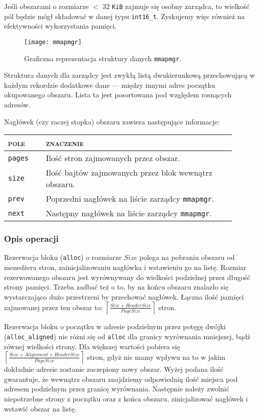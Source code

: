 \documentclass[12pt,a4paper,titlepage,twoside]{mwart}
\begin{document}
Jeśli obszarami o rozmiarze $<$ $32$ \verb+KiB+ zajmuje się osobny zarządca, to
wielkość pól będzie mógł składować w danej typu \verb+int16_t+. Zyskujemy więc
również na efektywności wykorzystania pamięci.

\begin{figure}[h]
\centering
\texttt{[image: mmapmgr]}
\caption{Graficzna reprezentacja struktury danych \texttt{mmapmgr}.}
\end{figure}

Struktura danych dla zarządcy jest zwykłą listą dwukierunkową przechowującą w
każdym rekordzie dodatkowe dane --- między innymi adres początku okupowanego
obszaru. Lista ta jest posortowana pod względem rosnących adresów.

Nagłówek (czy raczej stopka) obszaru zawiera następujące informacje:
\begin{center}
\begin{tabular}{|m{0.15\linewidth}|p{0.75\linewidth}|}
\hline
\textsc{pole} & \textsc{znaczenie} \\
\hline
\hline
\verb+pages+ & Ilość stron zajmowanych przez obszar. \\
\hline
\verb+size+	 & Ilość bajtów zajmowanych przez blok wewnątrz obszaru. \\
\hline
\verb+prev+	 & Poprzedni nagłówek na liście zarządcy \texttt{mmapmgr}. \\
\hline
\verb+next+	 & Następny nagłówek na liście zarządcy \texttt{mmapmgr}. \\
\hline
\end{tabular}
\end{center}

\subsubsection{Opis operacji}

Rezerwacja bloku (\verb+alloc+) o rozmiarze $Size$ polega na pobraniu obszaru od
menedżera stron, zainicjalizowaniu nagłówka i wstawieniu go na listę. Rozmiar
rezerwowanego obszaru jest wyrównywany do wielkości podzielnej przez długość
strony pamięci. Trzeba zadbać też o to, by na końcu obszaru znalazło się
wystarczająco dużo przestrzeni by przechować nagłówek. Łączna ilość pamięci
zajmowanej przez ten obszar to:
$\left\lceil\frac{Size + HeaderSize}{PageSize}\right\rceil$ stron.

Rezerwacja bloku o początku w adresie podzielnym przez potęgę dwójki
(\verb+alloc_aligned+) nie różni się od \verb+alloc+ dla granicy wyrównania
mniejszej, bądź równej wielkości strony. Dla większej wartości pobiera się 
$\left\lceil\frac{Size + Alignment + HeaderSize}{PageSize}\right\rceil$
stron, gdyż nie mamy wpływu na to w jakim dokładnie adresie zostanie zaczepiony
nowy obszar. Wyżej podana ilość gwarantuje, że wewnątrz obszaru znajdziemy
odpowiednią ilość miejsca pod adresem podzielnym przez granicę wyrównania.
Następnie należy zwolnić niepotrzebne strony z początku oraz z końca obszaru,
zinicjalizować nagłówek i wstawić obszar na listę.
\end{document}
